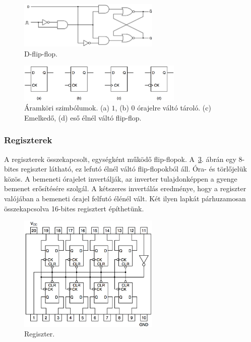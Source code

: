 \documentclass[10pt]{article}
\begin{document}
\begin{figure}[htbp]
	\centering
		\includegraphics[width=0.6\textwidth]{img/dflipflop}
	\caption{D-flip-flop.\label{fig:dflipflop}}
\end{figure}

\begin{figure}[htbp]
	\centering
		\includegraphics[width=0.7\textwidth]{img/flipflopszimbolumok}
	\caption{Áramköri szimbólumok. (a) $1$, (b) $0$ órajelre váltó tároló. (c) Emelkedő, (d) eső élnél váltó flip-flop.\label{fig:flipflopszimbolumok}}
\end{figure}

\subsubsection{Regiszterek}

A regiszterek összekapcsolt, egységként működő flip-flopok. A~\ref{fig:regiszter}. ábrán egy 8-bites regiszter látható, ez lefutó élnél váltó flip-flopokból áll. Óra- és törlőjelük közös. A bemeneti órajelet invertálják, az inverter tulajdonképpen a gyenge bemenet erősítésére szolgál. A kétszeres invertálás eredménye, hogy a regiszter valójában a bemeneti órajel felfutó élénél vált. Két ilyen lapkát párhuzamosan összekapcsolva 16-bites regisztert építhetünk.

\begin{figure}[htbp]
	\centering
		\includegraphics[width=0.6\textwidth]{img/regiszter}
	\caption{Regiszter.\label{fig:regiszter}}
\end{figure}
\end{document}
